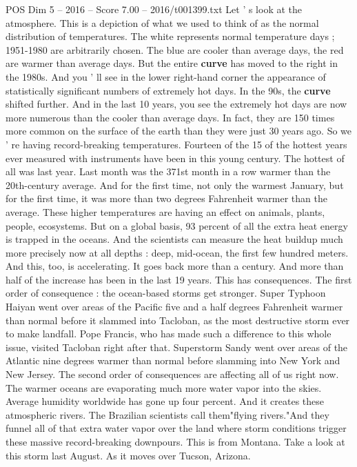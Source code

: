 \begin{textsample}{POS Dim 5 – 2016 – Score 7.00 – 2016/t001399.txt}
Let ' s look at the atmosphere.
This is a depiction of what we used to think of as the normal distribution of temperatures.
The white represents normal temperature days ; 1951-1980 are arbitrarily chosen.
The blue are cooler than average days, the red are warmer than average days.
But the entire \textbf{curve} has moved to the right in the 1980s.
And you ' ll see in the lower right-hand corner the appearance of statistically significant numbers of extremely hot days.
In the 90s, the \textbf{curve} shifted further.
And in the last 10 years, you see the extremely hot days are now more numerous than the cooler than average days.
In fact, they are 150 times more common on the surface of the earth than they were just 30 years ago.
So we ' re having record-breaking temperatures.
Fourteen of the 15 of the hottest years ever measured with instruments have been in this young century.
The hottest of all was last year.
Last month was the 371st month in a row warmer than the 20th-century average.
And for the first time, not only the warmest January, but for the first time, it was more than two degrees Fahrenheit warmer than the average.
These higher temperatures are having an effect on animals, plants, people, ecosystems.
But on a global basis, 93 percent of all the extra heat energy is trapped in the oceans.
And the scientists can measure the heat buildup much more precisely now at all depths : deep, mid-ocean, the first few hundred meters.
And this, too, is accelerating.
It goes back more than a century.
And more than half of the increase has been in the last 19 years.
This has consequences.
The first order of consequence : the ocean-based storms get stronger.
Super Typhoon Haiyan went over areas of the Pacific five and a half degrees Fahrenheit warmer than normal before it slammed into Tacloban, as the most destructive storm ever to make landfall.
Pope Francis, who has made such a difference to this whole issue, visited Tacloban right after that.
Superstorm Sandy went over areas of the Atlantic nine degrees warmer than normal before slamming into New York and New Jersey.
The second order of consequences are affecting all of us right now.
The warmer oceans are evaporating much more water vapor into the skies.
Average humidity worldwide has gone up four percent.
And it creates these atmospheric rivers.
The Brazilian scientists call them"flying rivers."And they funnel all of that extra water vapor over the land where storm conditions trigger these massive record-breaking downpours.
This is from Montana.
Take a look at this storm last August.
As it moves over Tucson, Arizona.

\end{textsample}
